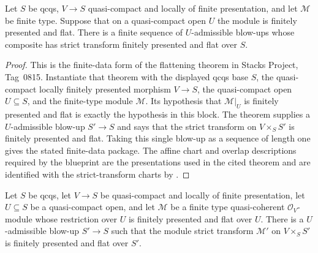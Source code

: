 \begin{lemma}
  \label{lemma:nagata-finite-data-flattening-package}

  Let $S$ be qcqs, $V\to S$ quasi-compact and locally of finite
  presentation, and let $\mathcal M$ be finite type.  Suppose that on a
  quasi-compact open $U$ the module is finitely presented and flat.  There
  is a finite sequence of $U$-admissible blow-ups whose composite has strict
  transform finitely presented and flat over $S$.
\end{lemma}

\begin{proof}
  This is the finite-data form of the flattening theorem in Stacks Project,
  Tag~0815.  Instantiate that theorem with the displayed qcqs base $S$, the
  quasi-compact locally finitely presented morphism $V\to S$, the
  quasi-compact open $U\subseteq S$, and the finite-type module
  $\mathcal M$.  Its hypothesis that $\mathcal M|_U$ is finitely presented and
  flat is exactly the hypothesis in this block.  The theorem supplies a
  $U$-admissible blow-up $S'\to S$ and says that the strict transform on
  $V\times_SS'$ is finitely presented and flat.  Taking this single blow-up as
  a sequence of length one gives the stated finite-data package.  The affine
  chart and overlap descriptions required by the blueprint are the
  presentations used in the cited theorem and are identified with the
  strict-transform charts by
  .
\end{proof}

\begin{theorem}
  \label{thm:nagata-module-flattening-by-blowup}

  Let $S$ be qcqs, let $V\to S$ be quasi-compact and locally of finite
  presentation, let $U\subseteq S$ be a quasi-compact open, and let
  $\mathcal M$ be a finite type quasi-coherent $\mathcal O_V$-module whose
  restriction over $U$ is finitely presented and flat over $U$.  There is a
  $U$-admissible blow-up $S'\to S$ such that the module strict transform
  $\mathcal M'$ on $V\times_SS'$ is finitely presented and flat over $S'$.
\end{theorem}

